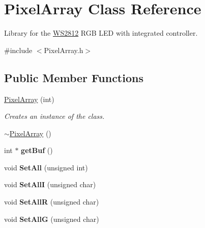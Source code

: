 \hypertarget{class_pixel_array}{}\section{Pixel\+Array Class Reference}
\label{class_pixel_array}


Library for the \hyperlink{class_w_s2812}{W\+S2812} R\+GB L\+ED with integrated controller.  




{\ttfamily \#include $<$Pixel\+Array.\+h$>$}

\subsection*{Public Member Functions}
\begin{DoxyCompactItemize}
\item 
\hyperlink{class_pixel_array_a86359f5eda90e0d12e3aa2c102ade21d}{Pixel\+Array} (int)
\begin{DoxyCompactList}\small\item\em Creates an instance of the class. \end{DoxyCompactList}\item 
\hyperlink{class_pixel_array_a9f4d10fcbd08290dfdecafb2ed4ad687}{$\sim$\+Pixel\+Array} ()
\item 
\mbox{\label{class_pixel_array_a987f1dc053a5cf25d78d5cfe037088d3}} 
int $\ast$ {\bfseries get\+Buf} ()
\item 
\mbox{\label{class_pixel_array_a5f560dcef3d1582614858969b20da89d}} 
void {\bfseries Set\+All} (unsigned int)
\item 
\mbox{\label{class_pixel_array_a9433e281c3cc0e4f8bbf23e127d8ad2c}} 
void {\bfseries Set\+AllI} (unsigned char)
\item 
\mbox{\label{class_pixel_array_a9ddfdd1a01a9877e4bfcf5a462412fd2}} 
void {\bfseries Set\+AllR} (unsigned char)
\item 
\mbox{\label{class_pixel_array_a88f25ee1b266e2dc0ef7ae90ff4bd12d}} 
void {\bfseries Set\+AllG} (unsigned char)
\item 
\mbox{\label{class_pixel_array_a3b17271fdc21503236ca6ca8e37d501b}} 

\end{DoxyCompactItemize}
